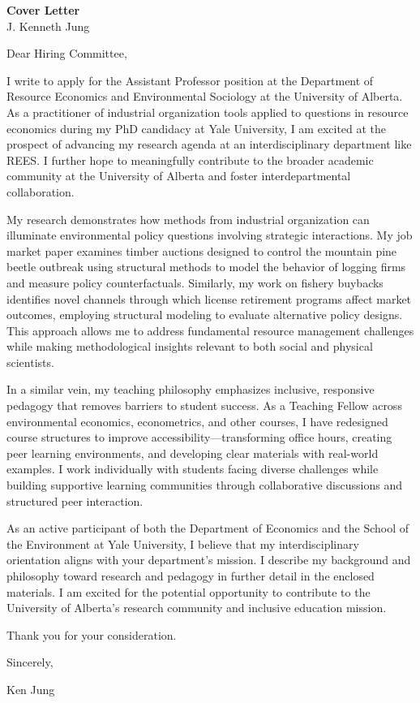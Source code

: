 \documentclass[11pt,letterpaper]{article}
\newenvironment{cvheader}
{\begin{center}\Large}
{\end{center}}
\begin{document}
\begin{cvheader}
{\Huge\textbf{Cover Letter}}\\
{\large\textcolor{mediumgray}{J. Kenneth Jung}}
\end{cvheader}

\vspace{8pt}

Dear Hiring Committee,

I write to apply for the Assistant Professor position at the Department of Resource Economics and Environmental Sociology at the University of Alberta. As a practitioner of industrial organization tools applied to questions in resource economics during my PhD candidacy at Yale University, I am excited at the prospect of advancing my research agenda at an interdisciplinary department like REES. I further hope to meaningfully contribute to the broader academic community at the University of Alberta and foster interdepartmental collaboration.

My research demonstrates how methods from industrial organization can illuminate environmental policy questions involving strategic interactions. My job market paper examines timber auctions designed to control the mountain pine beetle outbreak using structural methods to model the behavior of logging firms and measure policy counterfactuals. Similarly, my work on fishery buybacks identifies novel channels through which license retirement programs affect market outcomes, employing structural modeling to evaluate alternative policy designs. This approach allows me to address fundamental resource management challenges while making methodological insights relevant to both social and physical scientists.

In a similar vein, my teaching philosophy emphasizes inclusive, responsive pedagogy that removes barriers to student success. As a Teaching Fellow across environmental economics, econometrics, and other courses, I have redesigned course structures to improve accessibility—transforming office hours, creating peer learning environments, and developing clear materials with real-world examples. I work individually with students facing diverse challenges while building supportive learning communities through collaborative discussions and structured peer interaction.

As an active participant of both the Department of Economics and the School of the Environment at Yale University, I believe that my interdisciplinary orientation aligns with your department's mission. I describe my background and philosophy toward research and pedagogy in further detail in the enclosed materials. I am excited for the potential opportunity to contribute to the University of Alberta's research community and inclusive education mission.

Thank you for your consideration.

Sincerely,

Ken Jung
\end{document}
